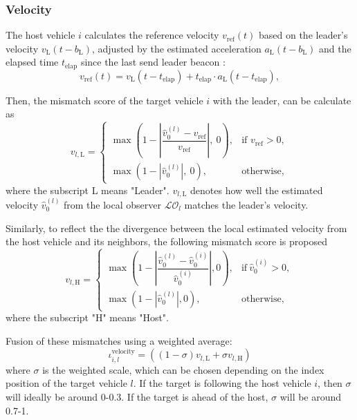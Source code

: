 \documentclass[letterpaper, 10pt, conference]{ieeeconf}  %
\def\N{\mathcal{N}} %
\def\LO{\mathcal{LO}} %
\begin{document}
\subsubsection{Velocity}
The host vehicle $i$ calculates the reference velocity $v_{\text{ref}}(t)$ based on the leader's velocity $v_{\text{L}}(t-b_{\text{L}})$, adjusted by the estimated acceleration $a_{\text{L}}(t-b_{\text{L}})$ and the elapsed time $t_{\text{elap}}$ since the last send leader beacon :
\begin{equation}
    v_{\text{ref}}(t) = {v}_{\text{L}}(t-t_{\text{elap}}) + t_{\text{elap}} \cdot {a}_{\text{L}}(t-t_{\text{elap}}), 
\end{equation}

Then, the mismatch score of the target vehicle $i$ with the leader, can be calculate as
\begin{equation}
    v_{l,\text{L}} = 
        \begin{cases} 
            \max\left(1 - \left|\dfrac{\hat{v}_{0}^{(l)} - v_{\text{ref}}}{v_{\text{ref}}}\right|,\  0\right), & \text{if } v_\text{ref} > 0, \\
            \max\left(1 - | \hat{v}_{0}^{(l)}|,\  0\right), & \text{otherwise},
        \end{cases}
\end{equation}
where the subscript L means "Leader". 
$v_{l,\text{L}}$ denotes how well the estimated velocity $\hat{v}_{0}^{(l)}$ from the local observer $\LO_{l}$ matches the leader's velocity. 

Similarly, to reflect the the divergence between the local estimated velocity from the host vehicle and its neighbors, the following mismatch score is proposed
\begin{equation}
    v_{l,\text{H}} = 
        \begin{cases} 
            \max\left(1 - \left|\dfrac{\hat{v}_{0}^{(l)} - \hat{v}_{0}^{(i)}}{\hat{v}_{0}^{(i)}}\right|,  0\right), & \text{if} \  \hat{v}_{0}^{(i)} > 0, \\
            \max\left(1 - |\hat{v}_{0}^{(l)}|,  0\right), & \text{otherwise},
        \end{cases}
\end{equation}
where the subscript "H" means "Host". 



Fusion of these mismatches using a weighted average:
\begin{equation}
    \iota_{i,l}^\text{velocity} = ((1-\sigma) v_{l,\text{L}} +\sigma  v_{l,\text{H}})    
\end{equation}
where $\sigma$ is the weighted scale, which can be chosen depending on the index position of the target vehicle $l$. If the target is following the host vehicle $i$, then $\sigma$ will ideally be around 0-0.3. If the target is ahead of the host, $\sigma$ will be around 0.7-1.
\end{document}
